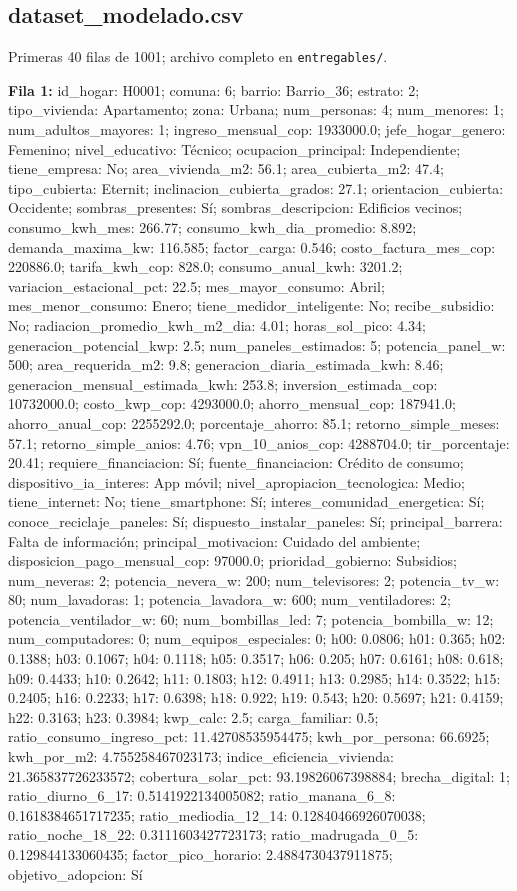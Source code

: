 \subsection*{dataset\_modelado.csv}
{\footnotesize Primeras 40 filas de 1001; archivo completo en \texttt{entregables/}.}\\
{\footnotesize\textbf{Fila 1:} id\_hogar: H0001; comuna: 6; barrio: Barrio\_36; estrato: 2; tipo\_vivienda: Apartamento; zona: Urbana; num\_personas: 4; num\_menores: 1; num\_adultos\_mayores: 1; ingreso\_mensual\_cop: 1933000.0; jefe\_hogar\_genero: Femenino; nivel\_educativo: Técnico; ocupacion\_principal: Independiente; tiene\_empresa: No; area\_vivienda\_m2: 56.1; area\_cubierta\_m2: 47.4; tipo\_cubierta: Eternit; inclinacion\_cubierta\_grados: 27.1; orientacion\_cubierta: Occidente; sombras\_presentes: Sí; sombras\_descripcion: Edificios vecinos; consumo\_kwh\_mes: 266.77; consumo\_kwh\_dia\_promedio: 8.892; demanda\_maxima\_kw: 116.585; factor\_carga: 0.546; costo\_factura\_mes\_cop: 220886.0; tarifa\_kwh\_cop: 828.0; consumo\_anual\_kwh: 3201.2; variacion\_estacional\_pct: 22.5; mes\_mayor\_consumo: Abril; mes\_menor\_consumo: Enero; tiene\_medidor\_inteligente: No; recibe\_subsidio: No; radiacion\_promedio\_kwh\_m2\_dia: 4.01; horas\_sol\_pico: 4.34; generacion\_potencial\_kwp: 2.5; num\_paneles\_estimados: 5; potencia\_panel\_w: 500; area\_requerida\_m2: 9.8; generacion\_diaria\_estimada\_kwh: 8.46; generacion\_mensual\_estimada\_kwh: 253.8; inversion\_estimada\_cop: 10732000.0; costo\_kwp\_cop: 4293000.0; ahorro\_mensual\_cop: 187941.0; ahorro\_anual\_cop: 2255292.0; porcentaje\_ahorro: 85.1; retorno\_simple\_meses: 57.1; retorno\_simple\_anios: 4.76; vpn\_10\_anios\_cop: 4288704.0; tir\_porcentaje: 20.41; requiere\_financiacion: Sí; fuente\_financiacion: Crédito de consumo; dispositivo\_ia\_interes: App móvil; nivel\_apropiacion\_tecnologica: Medio; tiene\_internet: No; tiene\_smartphone: Sí; interes\_comunidad\_energetica: Sí; conoce\_reciclaje\_paneles: Sí; dispuesto\_instalar\_paneles: Sí; principal\_barrera: Falta de información; principal\_motivacion: Cuidado del ambiente; disposicion\_pago\_mensual\_cop: 97000.0; prioridad\_gobierno: Subsidios; num\_neveras: 2; potencia\_nevera\_w: 200; num\_televisores: 2; potencia\_tv\_w: 80; num\_lavadoras: 1; potencia\_lavadora\_w: 600; num\_ventiladores: 2; potencia\_ventilador\_w: 60; num\_bombillas\_led: 7; potencia\_bombilla\_w: 12; num\_computadores: 0; num\_equipos\_especiales: 0; h00: 0.0806; h01: 0.365; h02: 0.1388; h03: 0.1067; h04: 0.1118; h05: 0.3517; h06: 0.205; h07: 0.6161; h08: 0.618; h09: 0.4433; h10: 0.2642; h11: 0.1803; h12: 0.4911; h13: 0.2985; h14: 0.3522; h15: 0.2405; h16: 0.2233; h17: 0.6398; h18: 0.922; h19: 0.543; h20: 0.5697; h21: 0.4159; h22: 0.3163; h23: 0.3984; kwp\_calc: 2.5; carga\_familiar: 0.5; ratio\_consumo\_ingreso\_pct: 11.42708535954475; kwh\_por\_persona: 66.6925; kwh\_por\_m2: 4.755258467023173; indice\_eficiencia\_vivienda: 21.365837726233572; cobertura\_solar\_pct: 93.19826067398884; brecha\_digital: 1; ratio\_diurno\_6\_17: 0.5141922134005082; ratio\_manana\_6\_8: 0.1618384651717235; ratio\_mediodia\_12\_14: 0.12840466926070038; ratio\_noche\_18\_22: 0.3111603427723173; ratio\_madrugada\_0\_5: 0.129844133060435; factor\_pico\_horario: 2.4884730437911875; objetivo\_adopcion: Sí\par}
